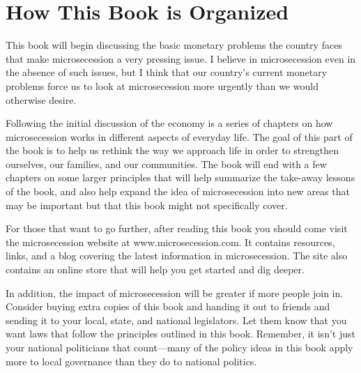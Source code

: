 \section{How This Book is Organized}

This book will begin discussing the basic monetary problems the country
faces that make microsecession a very pressing issue. I believe in
microsecession even in the absence of such issues, but I think that
our country’s current monetary problems force us to look at
microsecession more urgently than we would otherwise desire. 

Following the initial discussion of the economy is a series of chapters
on how microsecession works in different aspects of everyday life. The
goal of this part of the book is to help us rethink the way we approach
life in order to strengthen ourselves, our families, and our
communities. The book will end with a few chapters on some larger
principles that will help summarize the take-away lessons of the book,
and also help expand the idea of microsecession into new areas
that may be important but that this book might not specifically cover.

\begin{infonote}
For those that want to go further, after reading this book you should come 
visit the microsecession website at www.microsecession.com.
It contains resources, links, and a blog covering the latest information
in microsecession.  The site also contains an online store that
will help you get started and dig deeper.

In addition, the impact of microsecession will be greater if
more people join in.  Consider buying extra copies of this book
and handing it out to friends and sending it to your local, state,
and national legislators.  Let them know that you want laws
that follow the principles outlined in this book.  Remember, it
isn't just your national politicians that count---many of the policy
ideas in this book apply more to local governance than they do to 
national politics.
\end{infonote}
